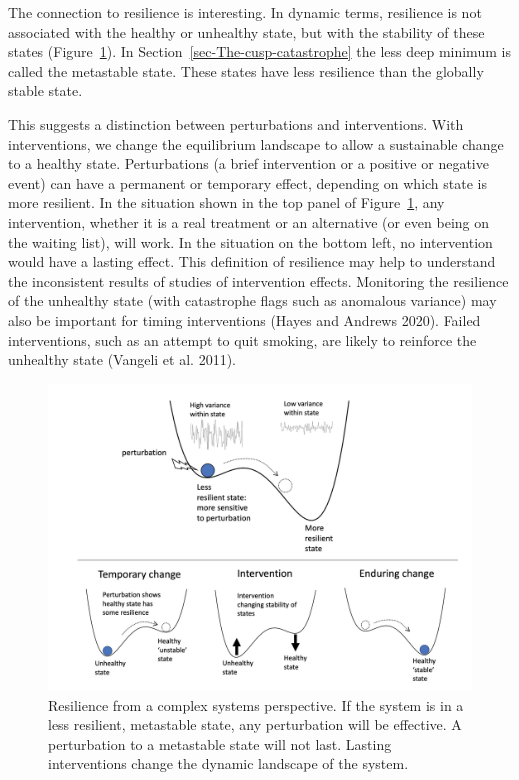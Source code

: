 \documentclass[
  a4paper,
  DIV=11,
  numbers=noendperiod]{scrreprt}
\begin{document}
The connection to resilience is interesting. In dynamic terms,
resilience is not associated with the healthy or unhealthy state, but
with the stability of these states (Figure~\ref{fig-ch6-img10-old-79}).
In Section~\ref{sec-The-cusp-catastrophe} the less deep minimum is
called the metastable state. These states have less resilience than the
globally stable state.

This suggests a distinction between perturbations and interventions.
With interventions, we change the equilibrium landscape to allow a
sustainable change to a healthy state. Perturbations (a brief
intervention or a positive or negative event) can have a permanent or
temporary effect, depending on which state is more resilient. In the
situation shown in the top panel of Figure~\ref{fig-ch6-img10-old-79},
any intervention, whether it is a real treatment or an alternative (or
even being on the waiting list), will work. In the situation on the
bottom left, no intervention would have a lasting effect. This
definition of resilience may help to understand the inconsistent results
of studies of intervention effects. Monitoring the resilience of the
unhealthy state (with catastrophe flags such as anomalous variance) may
also be important for timing interventions (Hayes and Andrews 2020).
Failed interventions, such as an attempt to quit smoking, are likely to
reinforce the unhealthy state (Vangeli et al. 2011).

\begin{figure}

{\centering \includegraphics{media/ch6/image10.jpg}

}

\caption{\label{fig-ch6-img10-old-79}Resilience from a complex systems
perspective. If the system is in a less resilient, metastable state, any
perturbation will be effective. A perturbation to a metastable state
will not last. Lasting interventions change the dynamic landscape of the
system.}

\end{figure}
\end{document}

